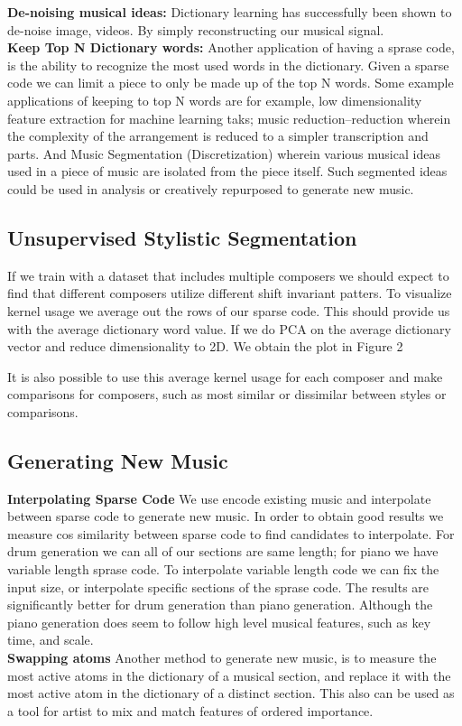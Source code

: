 \documentclass[11pt,a4paper]{article}
\begin{document}
 \textbf{De-noising musical ideas: } Dictionary learning has successfully been shown to de-noise image, videos. By simply reconstructing our musical signal. 
\\
 \textbf{Keep Top N Dictionary words: } Another application of having a sprase code, is the ability to recognize the most used words in the dictionary. Given a sparse code we can limit a piece to only be made up of the top N words. Some example applications of keeping to top N words are for example, low dimensionality feature extraction for machine learning taks; music reduction--reduction wherein the complexity of the arrangement is reduced to a simpler transcription and parts. And Music Segmentation (Discretization) wherein various musical ideas used in a piece of music are isolated from the piece itself. Such segmented ideas could be used in analysis or creatively repurposed to generate new music.


\subsection{Unsupervised Stylistic Segmentation }

If we train with a dataset that includes multiple composers we should expect to find that different composers utilize different shift invariant patters. To visualize kernel usage we average out the rows of our sparse code. This should provide us with the average dictionary word value. If we do PCA on the average dictionary vector and reduce dimensionality to 2D. We obtain the plot in Figure 2

It is also possible to use this average kernel usage for each composer and make comparisons for composers, such as most similar or dissimilar between styles or comparisons. 


\subsection{Generating New Music}
 \textbf{Interpolating Sparse Code } We use encode existing music and interpolate between sparse code to generate new music. In order to obtain good results we measure cos similarity between sparse code to find candidates to interpolate. For drum generation we can all of our sections are same length; for piano we have variable length sprase code. To interpolate variable length code we can fix the input size, or interpolate specific sections of the sprase code. The results are significantly better for drum generation than piano generation. Although the piano generation does seem to follow high level musical features, such as key time, and scale.
 \\
 \textbf{Swapping atoms } Another method to generate new music, is to measure the most active atoms in the dictionary of a musical section, and replace it with the most active atom in the dictionary of a distinct section. This also can be used as a tool for artist to mix and match features of ordered importance. 
\end{document}
